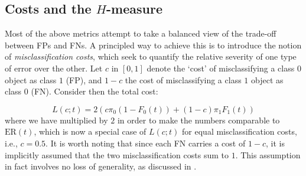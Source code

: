 \documentclass{article}
\begin{document}
\subsection{Costs and the $H$-measure}\label{sec:costs}
Most of the above metrics attempt to take a balanced view of the trade-off between FPs and FNs. A principled way to achieve this is to introduce the notion of \emph{misclassification costs}, which seek to quantify the relative severity of one type of error over the other. 
Let $c$ in $[0,1]$ denote the `cost' of misclassifying a class $0$ object as class $1$ (FP), and $1-c$ the cost of misclassifying a class $1$ object as class $0$ (FN). Consider then the total cost:

\[
L(c;t) = 2(c\pi_0 (1-F_0(t)) + (1-c)\pi_1 F_1(t))
\]
where we have multiplied by $2$ in order to make the numbers comparable to $\text{ER}(t)$, which is now a special case of $L(c;t)$ for equal misclassification costs, i.e., $c=0.5$. It is worth noting that since each FN carries a cost of $1-c$, it is implicitly assumed that the two misclassification costs sum to $1$. This assumption in fact involves no loss of generality, as discussed in \cite{hand2009}. 
\end{document}
